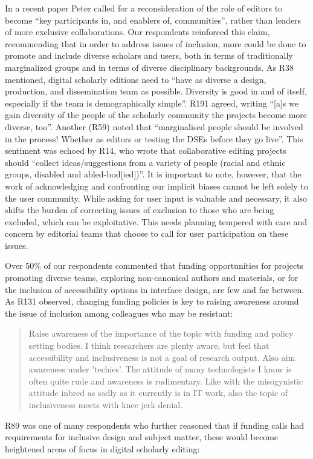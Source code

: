 \begin{paper}
In a recent paper Peter \citet[875]{robinson_project-based_2016} called for a
reconsideration of the role of editors to become ``key participants in,
and enablers of, communities'', rather than leaders of more exclusive
collaborations. Our respondents reinforced this claim, recommending that
in order to address issues of inclusion, more could be done to promote
and include diverse scholars and users, both in terms of traditionally
marginalized groups and in terms of diverse disciplinary backgrounds. As
R38 mentioned, digital scholarly editions need to ``have as diverse a
design, production, and dissemination team as possible. Diversity is
good in and of itself, especially if the team is demographically
simple''. R191 agreed, writing ``{[}a{]}s we gain diversity of the
people of the scholarly community the projects become more diverse,
too''. Another (R59) noted that ``marginalised people should be involved
in the process! Whether as editors or testing the DSEs before they go
live''. This sentiment was echoed by R14, who wrote that collaborative
editing projects should ``collect ideas/suggestions from a variety of
people (racial and ethnic groups, disabled and abled-bod{[}ied{]})''. It
is important to note, however, that the work of acknowledging and
confronting our implicit biases cannot be left solely to the user
community. While asking for user input is valuable and necessary, it
also shifts the burden of correcting issues of exclusion to those who
are being excluded, which can be exploitative. This needs planning
tempered with care and concern by editorial teams that choose to call
for user participation on these issues.

Over 50\% of our respondents commented that funding opportunities for
projects promoting diverse teams, exploring non-canonical authors and
materials, or for the inclusion of accessibility options in interface
design, are few and far between. As R131 observed, changing funding
policies is key to raising awareness around the issue of inclusion among
colleagues who may be resistant:

\begin{quote}
Raise awareness of the importance of the topic with funding and policy
setting bodies. I think researchers are plenty aware, but feel that
accessibility and inclusiveness is not a goal of research output. Also
aim awareness under 'techies'. The attitude of many technologists I know
is often quite rude and awareness is rudimentary. Like with the
misogynistic attitude inbred as sadly as it currently is in IT work,
also the topic of inclusiveness meets with knee jerk denial.
\end{quote}
R89 was one of many respondents who further reasoned that if funding
calls had requirements for inclusive design and subject matter, these
would become heightened areas of focus in digital scholarly editing:


\end{paper}
